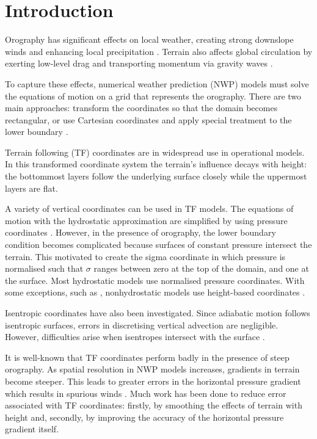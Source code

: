 \chapter{Introduction}

Orography has significant effects on local weather, creating strong downslope winds and enhancing local precipitation \autocite{barry2008}.  Terrain also affects global circulation by exerting low-level drag \autocite{lott-miller1997} and transporting momentum via gravity waves \autocite{mcfarlane1987}.

To capture these effects, numerical weather prediction (NWP) models must solve the equations of motion on a grid that represents the orography.
There are two main approaches: transform the coordinates so that the domain becomes rectangular, or use Cartesian coordinates and apply special treatment to the lower boundary \autocite{galchen-somerville1975}.

Terrain following (TF) coordinates are in widespread use in operational models.  In this transformed coordinate system the terrain's influence decays with height: the bottommost layers follow the underlying surface closely while the uppermost layers are flat.

A variety of vertical coordinates can be used in TF models.  The equations of motion with the hydrostatic approximation are simplified by using pressure coordinates \autocite{eliassen1949}.  However, in the presence of orography, the lower boundary condition becomes complicated because surfaces of constant pressure intersect the terrain.  This motivated \textcite{phillips1957} to create the sigma coordinate in which pressure is normalised such that $\sigma$ ranges between zero at the top of the domain, and one at the surface.
Most hydrostatic models use normalised pressure coordinates.  With some exceptions, such as \textcite{xue-thorpe1991}, nonhydrostatic models use height-based coordinates \autocite{steppeler2003}.

Isentropic coordinates have also been investigated.  Since adiabatic motion follows isentropic surfaces, errors in discretising vertical advection are negligible.  However, difficulties arise when isentropes intersect with the surface \autocite{konor-arakawa1997}.

It is well-known that TF coordinates perform badly in the presence of steep orography.  As spatial resolution in NWP models increases, gradients in terrain become steeper.  This leads to greater errors in the horizontal pressure gradient which results in spurious winds \autocite{dempsey-davis1998}.  Much work has been done to reduce error associated with TF coordinates: firstly, by smoothing the effects of terrain with height and, secondly, by improving the accuracy of the horizontal pressure gradient itself.

